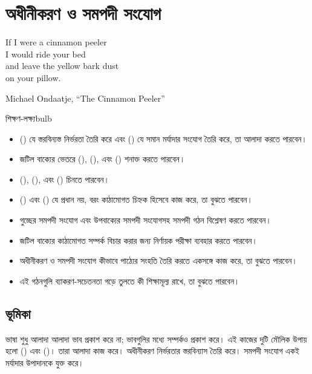 \chapter{অধীনীকরণ ও সমপদী সংযোগ} \label{ch:subord-coord-bn}

\epigraph{If I were a cinnamon peeler\\
I would ride your bed\\
and leave the yellow bark dust\\
on your pillow.}{Michael Ondaatje, \enquote{The Cinnamon Peeler}}

\begin{tblsframedsymbol}{শিক্ষণ-লক্ষ্য}{bulb}
\begin{itemize}[noitemsep, leftmargin=*]
    \item {} () যে স্তরবিন্যস্ত নির্ভরতা তৈরি করে এবং  () যে সমান মর্যাদার সংযোগ তৈরি করে, তা আলাদা করতে পারবেন।
    \item জটিল বাক্যের ভেতরে  (),  (), এবং  () শনাক্ত করতে পারবেন।
    \item {} (),  (), এবং  () চিনতে পারবেন।
    \item {} () এবং  () যে প্রধান নয়, বরং কাঠামোগত চিহ্নক হিসেবে কাজ করে, তা বুঝতে পারবেন।
    \item গুচ্ছের সমপদী সংযোগ এবং উপবাক্যের সমপদী সংযোগসহ সমপদী গঠন বিশ্লেষণ করতে পারবেন।
    \item জটিল বাক্যের কাঠামোগত সম্পর্ক বিচার করার জন্য নির্ণায়ক পরীক্ষা ব্যবহার করতে পারবেন।
    \item অধীনীকরণ ও সমপদী সংযোগ কীভাবে পাঠ্যের সংহতি তৈরি করতে একসঙ্গে কাজ করে, তা বুঝতে পারবেন।
    \item এই গঠনগুলি ব্যাকরণ-সচেতনতা গড়ে তুলতে কী শিক্ষামূল্য রাখে, তা বুঝতে পারবেন।
\end{itemize}
\end{tblsframedsymbol}

\section{ভূমিকা}

ভাষা শুধু আলাদা আলাদা ভাব প্রকাশ করে না; ভাবগুলির মধ্যে সম্পর্কও প্রকাশ করে। এই কাজের দুটি মৌলিক উপায় হলো  () এবং  ()। তারা আলাদা কাজ করে। অধীনীকরণ নির্ভরতার স্তরবিন্যাস তৈরি করে। সমপদী সংযোগ একই মর্যাদার উপাদানকে যুক্ত করে।

